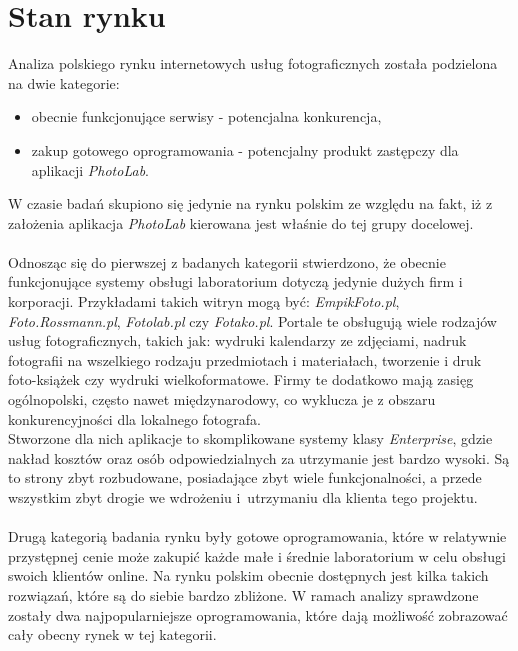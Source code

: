 \vspace*{0.01\baselineskip}

\section{Stan rynku}
\quad Analiza polskiego rynku internetowych usług fotograficznych została podzielona na dwie kategorie:
\begin{itemize}
    \item obecnie funkcjonujące serwisy - potencjalna konkurencja,
    \item zakup gotowego oprogramowania - potencjalny produkt zastępczy dla aplikacji \textit{PhotoLab}. 
\end{itemize}
W czasie badań skupiono się jedynie na rynku polskim ze względu na fakt, iż z założenia aplikacja \textit{PhotoLab} kierowana jest właśnie do tej grupy docelowej. \\
\\
Odnosząc się do pierwszej z badanych kategorii stwierdzono, że obecnie funkcjonujące systemy obsługi laboratorium dotyczą jedynie dużych firm i korporacji. Przykładami takich witryn mogą być: \textit{EmpikFoto.pl}, \textit{Foto.Rossmann.pl}, \textit{Fotolab.pl} czy \textit{Fotako.pl}. Portale te obsługują wiele rodzajów usług fotograficznych, takich jak: wydruki kalendarzy ze zdjęciami, nadruk fotografii na wszelkiego rodzaju przedmiotach i materiałach, tworzenie i druk foto-książek czy wydruki wielkoformatowe. Firmy te dodatkowo mają zasięg ogólnopolski, często nawet międzynarodowy, co wyklucza je z obszaru konkurencyjności dla lokalnego fotografa. 
\\
Stworzone dla nich aplikacje to skomplikowane systemy klasy \textit{Enterprise}, gdzie nakład kosztów oraz osób odpowiedzialnych za utrzymanie jest bardzo wysoki. Są to strony zbyt rozbudowane, posiadające zbyt wiele funkcjonalności, a przede wszystkim zbyt drogie we wdrożeniu i~utrzymaniu dla klienta tego projektu.\\
\\
Drugą kategorią badania rynku były gotowe oprogramowania, które w relatywnie przystępnej cenie może zakupić każde małe i średnie laboratorium w celu obsługi swoich klientów online. Na rynku polskim obecnie dostępnych jest kilka takich rozwiązań, które są do siebie bardzo zbliżone. W ramach analizy sprawdzone zostały dwa najpopularniejsze oprogramowania, które dają możliwość zobrazować cały obecny rynek w tej kategorii.\\
\\
